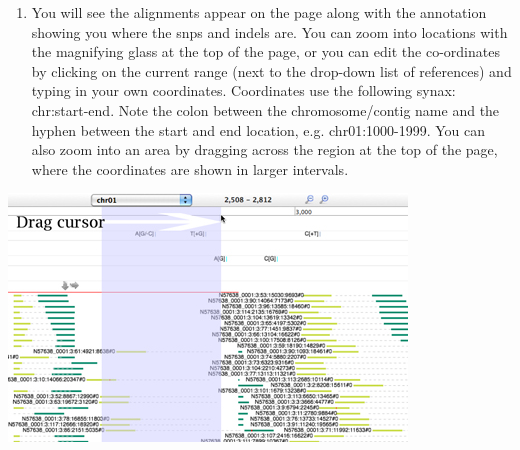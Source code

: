 \documentclass[12pt,a4paper]{article}
\begin{document}
\begin{enumerate}
	\item You will see the alignments appear on the page along
          with the annotation showing you where the snps and indels
          are. You can zoom into locations with the magnifying glass
          at the top of the page, or you can edit the co-ordinates by
          clicking on the current range (next to the drop-down list of
          references) and typing in your own coordinates. Coordinates
          use the following synax: chr:start-end. Note the colon
          between the chromosome/contig name and the hyphen between
          the start and end location, e.g. chr01:1000-1999. You can
          also zoom into an area by dragging across the region at the
          top of the page, where the coordinates are shown in larger
          intervals.
\end{enumerate}


\includegraphics{images/DragZoom.jpg}
\end{document}
